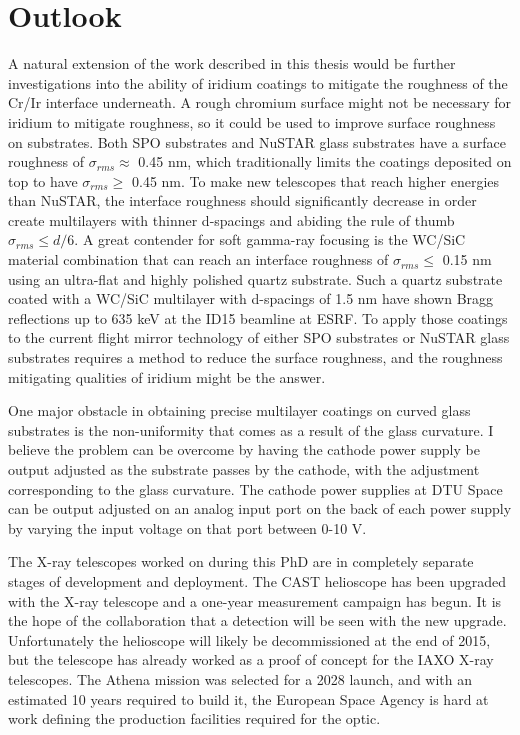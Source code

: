 \section{Outlook}
A natural extension of the work described in this thesis would be further investigations into the ability of iridium coatings to mitigate the roughness of the Cr/Ir interface underneath. A rough chromium surface might not be necessary for iridium to mitigate roughness, so it could be used to improve surface roughness on substrates. Both SPO substrates and NuSTAR glass substrates have a surface roughness of $\sigma_{rms}\approx$ 0.45 nm, which traditionally limits the coatings deposited on top to have $\sigma_{rms}\geq$ 0.45 nm. To make new telescopes that reach higher energies than NuSTAR, the interface roughness should significantly decrease in order create multilayers with thinner d-spacings and abiding the rule of thumb $\sigma_{rms} \leq d/6$. A great contender for soft gamma-ray focusing is the WC/SiC material combination that can reach an interface roughness of $\sigma_{rms}\leq$ 0.15 nm using an ultra-flat and highly polished quartz substrate. Such a quartz substrate coated with a WC/SiC multilayer with d-spacings of 1.5 nm have shown Bragg reflections up to 635 keV at the ID15 beamline at ESRF\cite{FernandezPerea:2012fj,FernandezPerea:2013jb}. To apply those coatings to the current flight mirror technology of either SPO substrates or NuSTAR glass substrates requires a method to reduce the surface roughness, and the roughness mitigating qualities of iridium might be the answer.

One major obstacle in obtaining precise multilayer coatings on curved glass substrates is the non-uniformity that comes as a result of the glass curvature. I believe the problem can be overcome by having the cathode power supply be output adjusted as the substrate passes by the cathode, with the adjustment corresponding to the glass curvature. The cathode power supplies at DTU Space can be output adjusted on an analog input port on the back of each power supply by varying the input voltage on that port between 0-10 V.

The X-ray telescopes worked on during this PhD are in completely separate stages of development and deployment. The CAST helioscope has been upgraded with the X-ray telescope and a one-year measurement campaign has begun. It is the hope of the collaboration that a detection will be seen with the new upgrade. Unfortunately the helioscope will likely be decommissioned at the end of 2015, but the telescope has already worked as a proof of concept for the IAXO X-ray telescopes. The Athena mission was selected for a 2028 launch, and with an estimated 10 years required to build it, the European Space Agency is hard at work defining the production facilities required for the optic.

